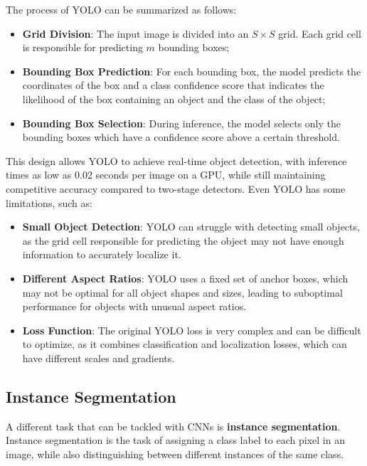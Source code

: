 The process of YOLO can be summarized as follows:
\begin{itemize}
    \item \textbf{Grid Division}: The input image is divided into an $S \times S$ grid. 
    Each grid cell is responsible for predicting $m$ bounding boxes;
    
    \item \textbf{Bounding Box Prediction}: For each bounding box, the model predicts the coordinates of
    the box and a class confidence score that indicates the likelihood of the box containing an object and the class of the object;
    
    \item \textbf{Bounding Box Selection}: During inference, the model selects only the bounding boxes which have
    a confidence score above a certain threshold.
\end{itemize}

This design allows YOLO to achieve real-time object detection, with inference times as low as 0.02 seconds per image on a GPU, while still maintaining competitive accuracy compared to two-stage detectors.
Even YOLO has some limitations, such as:

\begin{itemize}
    \item \textbf{Small Object Detection}: YOLO can struggle with detecting small objects, 
    as the grid cell responsible for predicting the object may not have enough information to accurately localize it.
    
    \item \textbf{Different Aspect Ratios}: YOLO uses a fixed set of anchor boxes, which may not be optimal for all object shapes and sizes, 
    leading to suboptimal performance for objects with unusual aspect ratios.
    
    \item \textbf{Loss Function}: The original YOLO loss is very complex and can be difficult to optimize,
    as it combines classification and localization losses, which can have different scales and gradients.
\end{itemize}

\subsection{Instance Segmentation}
A different task that can be tackled with CNNs is \textbf{instance segmentation}.
Instance segmentation is the task of assigning a class label to each pixel in an image, while also distinguishing between different instances of the same class.

